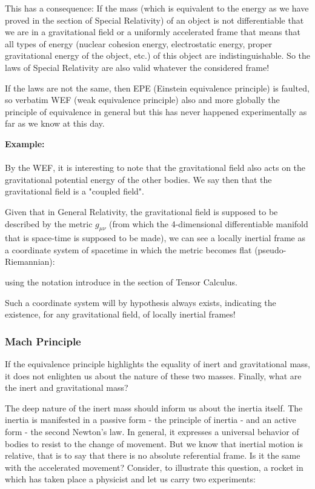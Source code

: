 	This has a consequence: If the mass (which is equivalent to the energy as we have proved in the section of Special Relativity) of an object is not differentiable that we are in a gravitational field or a uniformly accelerated frame that means that all types of energy (nuclear cohesion energy, electrostatic energy, proper gravitational energy of the object, etc.) of this object are indistinguishable. So the laws of Special Relativity are also valid whatever the considered frame!
	
	If the laws are not the same, then EPE (Einstein equivalence principle) is faulted, so verbatim WEF (weak equivalence principle) also and more globally the principle of equivalence in general but this has never happened experimentally as far as we know at this day.

	\begin{tcolorbox}[colframe=black,colback=white,sharp corners]
	\textbf{{\Large {}}Example:}\\\\
	By the WEF, it is interesting to note that the gravitational field also acts on the gravitational potential energy of the other bodies. We say then that the gravitational field is a "coupled field".
	\end{tcolorbox}
	
	Given that in General Relativity, the gravitational field is supposed to be described by the metric $g_{\mu\nu}$ (from which the 4-dimensional differentiable manifold that is space-time is supposed to be made), we can see a locally inertial frame as a coordinate system of spacetime in which the metric becomes flat (pseudo-Riemannian):
	
	using the notation introduce in the section of Tensor Calculus.
	
	Such a coordinate system will by hypothesis always exists, indicating the existence, for any gravitational field, of locally inertial frames!
	
	\subsubsection{Mach Principle}
	
	If the equivalence principle highlights the equality of inert and gravitational mass, it does not enlighten us about the nature of these two masses. Finally, what are the inert and gravitational mass?
	
	The deep nature of the inert mass should inform us about the inertia itself. The inertia is manifested in a passive form - the principle of inertia - and an active form - the second Newton's law. In general, it expresses a universal behavior of bodies to resist to the change of movement. But we know that inertial motion is relative, that is to say that there is no absolute referential frame. Is it the same with the accelerated movement? Consider, to illustrate this question, a rocket in which has taken place a physicist and let us carry two experiments:
	

